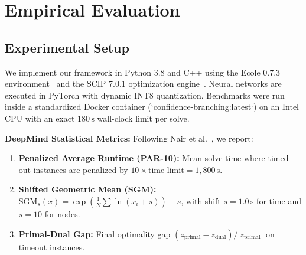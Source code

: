 \documentclass[10pt,twocolumn,letterpaper]{article}
\theoremstyle{plain}
\theoremstyle{definition}
\theoremstyle{remark}
\begin{document}
\section{Empirical Evaluation}
\label{sec:experiments}

\subsection{Experimental Setup}
We implement our framework in Python 3.8 and C++ using the Ecole 0.7.3 environment~\cite{prouvost2020ecole} and the SCIP 7.0.1 optimization engine~\cite{gamrath2020scip}. Neural networks are executed in PyTorch with dynamic INT8 quantization. Benchmarks were run inside a standardized Docker container (`confidence-branching:latest`) on an Intel CPU with an exact $180\,\text{s}$ wall-clock limit per solve.

\textbf{DeepMind Statistical Metrics:} Following Nair et al.~\cite{nair2020solving}, we report:
\begin{enumerate}
    \item \textbf{Penalized Average Runtime (PAR-10):} Mean solve time where timed-out instances are penalized by $10 \times \text{time\_limit} = 1,800\,\text{s}$.
    \item \textbf{Shifted Geometric Mean (SGM):} 
    $\text{SGM}_s(x) = \exp\left(\frac{1}{N}\sum \ln(x_i + s)\right) - s$, with shift $s = 1.0\,\text{s}$ for time and $s = 10$ for nodes.
    \item \textbf{Primal-Dual Gap:} Final optimality gap $(z_{\text{primal}} - z_{\text{dual}}) / |z_{\text{primal}}|$ on timeout instances.
\end{enumerate}
\end{document}
